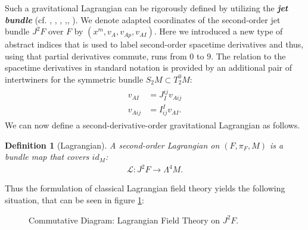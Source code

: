 \documentclass[%
 reprint,
nofootinbib,
 amsmath,amssymb,
 aps,
 prd,
floatfix,
]{revtex4-2}
\newtheorem{definition}{Definition}
\begin{document}
Such a gravitational Lagrangian can be rigorously defined by utilizing the \textit{\textbf{jet bundle}} (cf.  \cite{saunders_1989}, \cite{seiler1994analysis}, \cite{seiler2009involution}, \cite{kolar1993natural},\cite{Gotay1992StressEnergyMomentumTA}, \cite{1998physics...1019G}). 
We denote adapted coordinates of the second-order jet bundle $J^2F$ over $F$ by $(x^m, v_A, v_{Ap}, v_{AI})$. Here we introduced a new type of abstract indices that is used to label second-order spacetime derivatives and thus, using that partial derivatives commute, runs from $0$ to $9$. 
The relation to the spacetime derivatives in standard notation is provided by an additional pair of intertwiners for the symmetric bundle $S_2M\subset T^0_2M$:
\begin{align}
    \begin{aligned}
        v_{AI} &= J_I^{ij} v_{Aij}\\
    v_{Aij} &= I^I_{ij} v_{AI}.
    \end{aligned}
\end{align}
We can now define a second-derivative-order gravitational Lagrangian as follows.
\begin{definition}[Lagrangian]
A second-order Lagrangian on $(F,\pi_F,M)$ is a bundle map that covers $id_M$:
\begin{align}
    \mathcal{L} : J^2F \longrightarrow \Lambda^4M.
\end{align}
\end{definition}
Thus the formulation of classical Lagrangian field theory yields the following situation, that can be seen in figure \ref{diagram1}:
\begin{figure}[hbt!]
\centering
{}
\caption{Commutative Diagram: Lagrangian Field Theory on $J^2F$.} \label{diagram1}
\end{figure}
\end{document}
